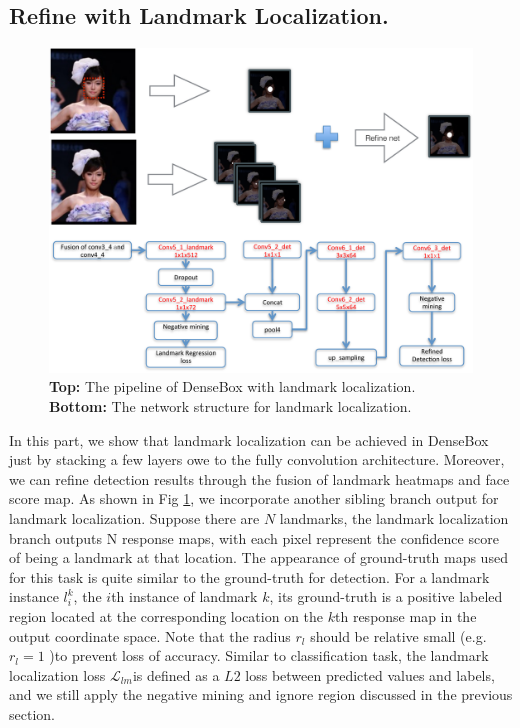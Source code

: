 \subsection{Refine with Landmark Localization.} 
	\begin{figure}[!hbtp]
	\centering
	 \includegraphics[scale=0.45]{figures/figure4-crop.pdf}
	\caption{\textbf{Top: } The pipeline of DenseBox with landmark localization. \textbf{Bottom: } The network structure for landmark localization. }
	\label{fig:fig_refine}
	\end{figure}
In this part, we show that landmark localization can be achieved in DenseBox just by stacking a few layers owe to the fully convolution architecture. Moreover, we can refine detection results through the fusion of landmark heatmaps and face score map. As shown in Fig \ref{fig:fig_refine},  we incorporate another sibling branch output for landmark localization. Suppose there are $N$ landmarks, the landmark localization branch outputs N response maps, with each pixel represent the confidence score of being a landmark at that location.  The appearance of ground-truth maps used for this task is quite similar to the ground-truth for detection.  For a landmark instance $l^k_i$, the $i$th instance of landmark $k$, its ground-truth is a positive labeled region located at the corresponding location on the $k$th response map in the output coordinate space.  Note that the radius $r_l$ should be relative small (e.g. $r_l = 1$  )to prevent loss of accuracy.   Similar to classification task, the landmark localization loss $\mathcal{L} _{lm}$is defined as a $L2$ loss between predicted values and labels, and we still apply the negative mining and ignore region discussed in the previous section. 

